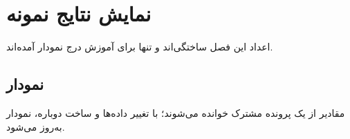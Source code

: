 \chapter{نمایش نتایج نمونه}
اعداد این فصل ساختگی‌اند و تنها برای آموزش درج نمودار آمده‌اند.
\section{نمودار}
\begin{ThesisChart}
\centering

\caption[مقایسه ساختگی]{مقایسه سه مقدار ساختگی از پوشه داده‌های نمونه؛ از این نمودار نباید نتیجه پژوهشی گرفت.}\label{fig:chart}
\end{ThesisChart}
مقادیر از یک پرونده مشترک خوانده می‌شوند؛ با تغییر داده‌ها و ساخت دوباره، نمودار به‌روز می‌شود.
